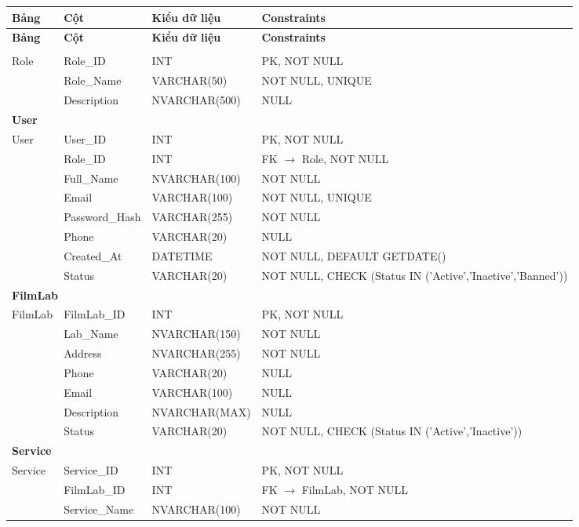 \documentclass[12pt,a4paper]{article}
\begin{document}
\begin{longtable}{|l|l|l|p{5.8cm}|}
\hline
\textbf{Bảng} & \textbf{Cột} & \textbf{Kiểu dữ liệu} & \textbf{Constraints} \\
\hline
\endfirsthead
\hline
\textbf{Bảng} & \textbf{Cột} & \textbf{Kiểu dữ liệu} & \textbf{Constraints} \\
\hline
\endhead
\hline
\endfoot

\multicolumn{4}{|l|}{\textbf{Role}} \\
\hline
Role & Role\_ID & INT & PK, NOT NULL \\
 & Role\_Name & VARCHAR(50) & NOT NULL, UNIQUE \\
 & Description & NVARCHAR(500) & NULL \\
\hline
\multicolumn{4}{|l|}{\textbf{User}} \\
\hline
User & User\_ID & INT & PK, NOT NULL \\
 & Role\_ID & INT & FK $\to$ Role, NOT NULL \\
 & Full\_Name & NVARCHAR(100) & NOT NULL \\
 & Email & VARCHAR(100) & NOT NULL, UNIQUE \\
 & Password\_Hash & VARCHAR(255) & NOT NULL \\
 & Phone & VARCHAR(20) & NULL \\
 & Created\_At & DATETIME & NOT NULL, DEFAULT GETDATE() \\
 & Status & VARCHAR(20) & NOT NULL, CHECK (Status IN ('Active','Inactive','Banned')) \\
\hline
\multicolumn{4}{|l|}{\textbf{FilmLab}} \\
\hline
FilmLab & FilmLab\_ID & INT & PK, NOT NULL \\
 & Lab\_Name & NVARCHAR(150) & NOT NULL \\
 & Address & NVARCHAR(255) & NOT NULL \\
 & Phone & VARCHAR(20) & NULL \\
 & Email & VARCHAR(100) & NULL \\
 & Description & NVARCHAR(MAX) & NULL \\
 & Status & VARCHAR(20) & NOT NULL, CHECK (Status IN ('Active','Inactive')) \\
\hline
\multicolumn{4}{|l|}{\textbf{Service}} \\
\hline
Service & Service\_ID & INT & PK, NOT NULL \\
 & FilmLab\_ID & INT & FK $\to$ FilmLab, NOT NULL \\
 & Service\_Name & NVARCHAR(100) & NOT NULL \\

\end{longtable}
\end{document}
